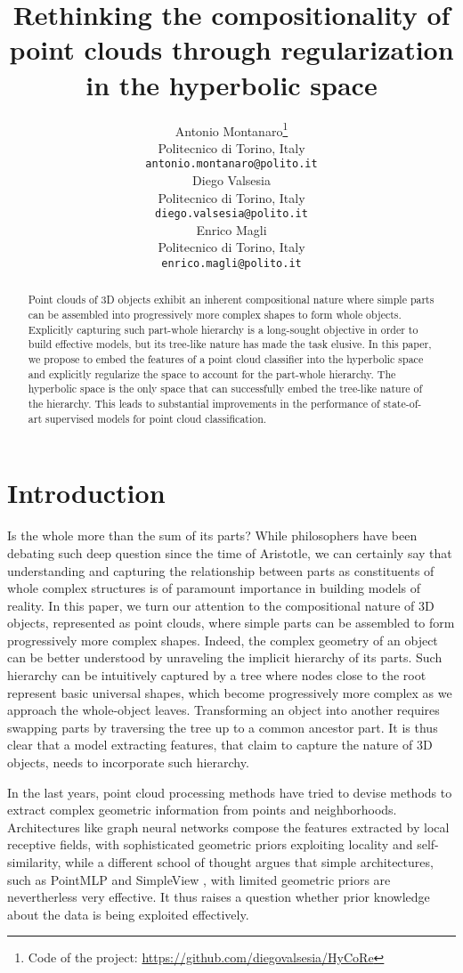\documentclass{article}
\title{Rethinking the compositionality of point clouds through regularization in the hyperbolic space}
\author{Antonio Montanaro\thanks{Code of the project: \url{https://github.com/diegovalsesia/HyCoRe} } \\
  Politecnico di Torino, Italy\\
  \texttt{antonio.montanaro@polito.it} \\
\And
  Diego Valsesia\\
  Politecnico di Torino, Italy\\
  \texttt{diego.valsesia@polito.it} \\
  \AND
  Enrico Magli\\
  Politecnico di Torino, Italy\\
  \texttt{enrico.magli@polito.it} \\
}
\begin{document}
\maketitle


\begin{abstract}
Point clouds of 3D objects exhibit an inherent compositional nature where simple parts can be assembled into progressively more complex shapes to form whole objects. Explicitly capturing such part-whole hierarchy is a long-sought objective in order to build effective models, but its tree-like nature has made the task elusive. In this paper, we propose to embed the features of a point cloud classifier into the hyperbolic space and explicitly regularize the space to account for the part-whole hierarchy. The hyperbolic space is the only space that can successfully embed the tree-like nature of the hierarchy. This leads to substantial improvements in the performance of state-of-art supervised models for point cloud classification.
\end{abstract}


\section{Introduction}

Is the whole more than the sum of its parts? While philosophers have been debating such deep question since the time of Aristotle, we can certainly say that understanding and capturing the relationship between parts as constituents of whole complex structures is of paramount importance in building models of reality. In this paper, we turn our attention to the compositional nature of 3D objects, represented as point clouds, where simple parts can be assembled to form progressively more complex shapes. Indeed, the complex geometry of an object can be better understood by unraveling the implicit hierarchy of its parts. Such hierarchy can be intuitively captured by a tree where nodes close to the root represent basic universal shapes, which become progressively more complex as we approach the whole-object leaves. Transforming an object into another requires swapping parts by traversing the tree up to a common ancestor part. It is thus clear that a model extracting features, that claim to capture the nature of 3D objects, needs to incorporate such hierarchy.

In the last years, point cloud processing methods have tried to devise methods to extract complex geometric information from points and neighborhoods. Architectures like graph neural networks \cite{shi2020point} compose the features extracted by local receptive fields, with sophisticated geometric priors \cite{chen2021equivariant} exploiting locality and self-similarity, while a different school of thought argues that simple architectures, such as PointMLP \cite{ma2022rethinking} and SimpleView \cite{goyal2021revisiting}, with limited geometric priors are nevertherless very effective. It thus raises a question whether prior knowledge about the data is being exploited effectively.
\end{document}
